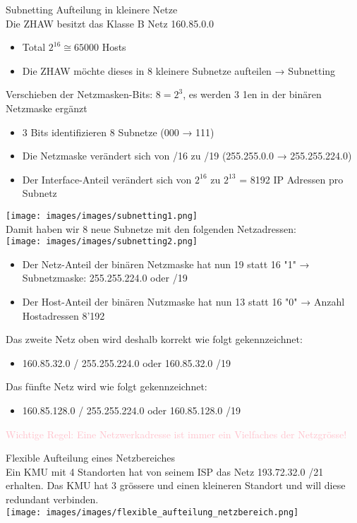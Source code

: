 \begin{concept}{Subnetting}
    Aufteilung in kleinere Netze\\
    Die ZHAW besitzt das Klasse B Netz 160.85.0.0
    \begin{itemize}
        \item Total $2^{16} \cong 65000$  Hosts
        \item Die ZHAW möchte dieses in 8 kleinere Subnetze aufteilen → Subnetting
    \end{itemize}
    Verschieben der Netzmasken-Bits: $8 = 2^3$, es werden 3 1en in der binären Netzmaske ergänzt
    \begin{itemize}
        \item 3 Bits identifizieren 8 Subnetze (000 → 111)
        \item Die Netzmaske verändert sich von /16 zu /19 (255.255.0.0 → 255.255.224.0)
        \item Der Interface-Anteil verändert sich von $2^{16}$ zu $2^{13}$ = 8192 IP Adressen pro Subnetz
    \end{itemize}
        \texttt{[image: images/images/subnetting1.png]}\\
    Damit haben wir 8 neue Subnetze mit den folgenden Netzadressen:\\
        \texttt{[image: images/images/subnetting2.png]}
    \begin{itemize}
        \item Der Netz-Anteil der binären Netzmaske hat nun 19 statt 16 "1" → Subnetzmaske: 255.255.224.0 oder /19
        \item Der Host-Anteil der binären Nutzmaske hat nun 13 statt 16 "0" → Anzahl Hostadressen 8'192
    \end{itemize}
    Das zweite Netz oben wird deshalb korrekt wie folgt gekennzeichnet:
    \begin{itemize}
        \item 160.85.32.0 / 255.255.224.0 oder 160.85.32.0 /19
    \end{itemize}
    Das fünfte Netz wird wie folgt gekennzeichnet:
    \begin{itemize}
        \item 160.85.128.0 / 255.255.224.0 oder 160.85.128.0 /19
    \end{itemize}
    \textcolor{pink}{Wichtige Regel: Eine Netzwerkadresse ist immer ein Vielfaches der Netzgrösse!}
\end{concept}

\begin{example2}{Flexible Aufteilung eines Netzbereiches}\\
    Ein KMU mit 4 Standorten hat von seinem ISP das Netz 193.72.32.0 /21 erhalten. Das KMU hat 3 grössere und einen kleineren Standort und will diese redundant verbinden.\\
        \texttt{[image: images/images/flexible\_aufteilung\_netzbereich.png]}    
\end{example2}


